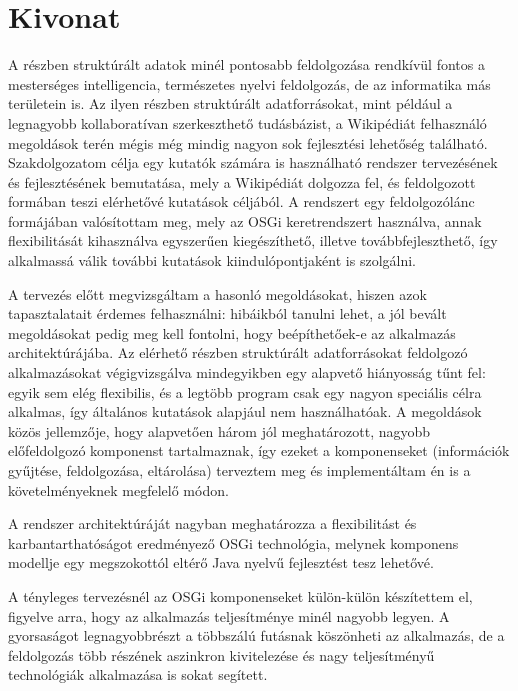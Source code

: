 \chapter*{Kivonat}

A részben struktúrált adatok minél pontosabb feldolgozása rendkívül fontos a mesterséges intelligencia, természetes nyelvi feldolgozás, de az informatika más területein is. Az ilyen részben struktúrált adatforrásokat, mint például a legnagyobb kollaboratívan szerkeszthető tudásbázist, a Wikipédiát felhasználó megoldások terén mégis még mindig nagyon sok fejlesztési lehetőség található. Szakdolgozatom célja egy kutatók számára is használható rendszer tervezésének és fejlesztésének bemutatása, mely a Wikipédiát dolgozza fel, és feldolgozott formában teszi elérhetővé kutatások céljából. A rendszert egy feldolgozólánc formájában valósítottam meg, mely az OSGi keretrendszert használva, annak flexibilitását kihasználva egyszerűen kiegészíthető, illetve továbbfejleszthető, így alkalmassá válik további kutatások kiindulópontjaként is szolgálni.

A tervezés előtt megvizsgáltam a hasonló megoldásokat, hiszen azok tapasztalatait érdemes felhasználni: hibáikból tanulni lehet, a jól bevált megoldásokat pedig meg kell fontolni, hogy beépíthetőek-e az alkalmazás architektúrájába. Az elérhető részben struktúrált adatforrásokat feldolgozó alkalmazásokat végigvizsgálva mindegyikben egy alapvető hiányosság tűnt fel: egyik sem elég flexibilis, és a legtöbb program csak egy nagyon speciális célra alkalmas, így általános kutatások alapjául nem használhatóak. A megoldások közös jellemzője, hogy alapvetően három jól meghatározott, nagyobb előfeldolgozó komponenst tartalmaznak, így ezeket a komponenseket (információk gyűjtése, feldolgozása, eltárolása) terveztem meg és implementáltam én is a követelményeknek megfelelő módon.

A rendszer architektúráját nagyban meghatározza a flexibilitást és karbantarthatóságot eredményező OSGi technológia, melynek komponens modellje egy megszokottól eltérő Java nyelvű fejlesztést tesz lehetővé.

A tényleges tervezésnél az OSGi komponenseket külön-külön készítettem el, figyelve arra, hogy az alkalmazás teljesítménye minél nagyobb legyen. A gyorsaságot legnagyobbrészt a többszálú futásnak köszönheti az alkalmazás, de a feldolgozás több részének aszinkron kivitelezése és nagy teljesítményű technológiák alkalmazása is sokat segített.

